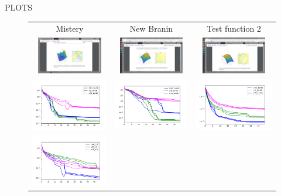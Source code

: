 \documentclass{beamer}
\begin{document}
\begin{frame}{PLOTS}
\begin{figure}
	
	\centering
	\begin{tabular}{ccc}
		Mistery&
		New Branin&
		Test function 2\\
		\includegraphics[height=1.6cm, trim={450 300 450 300},clip]{Mistery.png}&
		\includegraphics[height=1.6cm, trim={450 240 450 360},clip]{New_Branin.png}&
		\includegraphics[height=1.6cm, trim={450 230 450 370},clip]{test_function_2.png}\\
		\includegraphics[width=0.32\linewidth]{mistery_OC_1e-06.pdf}&
		\includegraphics[width=0.32\linewidth]{new_brannin_OC_1e-06.pdf}&
		\includegraphics[width=0.32\linewidth]{test_function_OC_1e-06.pdf}\\
		\includegraphics[width=0.32\linewidth]{mistery_OC_1_0.pdf}&

\end{tabular}
\end{figure}
\end{frame}
\end{document}
